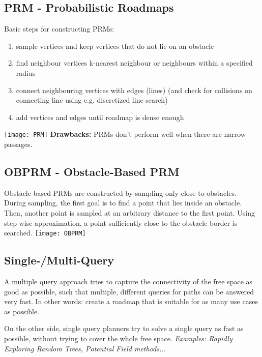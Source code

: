 \begin{multicols*}{2}
\subsection{PRM - Probabilistic Roadmaps}
Basic steps for constructing PRMs:
\begin{enumerate}
	\item sample vertices and keep vertices that do not lie on an obstacle
	\item find neighbour vertices
		\subitem k-nearest neighbour or
		\subitem neighbours within a specified radius
	\item connect neighbouring vertices with edges (lines) (and check for collisions on connecting line using e.g. discretized line search)
	\item add vertices and edges until roadmap is dense
enough
\end{enumerate}
\texttt{[image: PRM]}
\textbf{Drawbacks: } PRMs don't perform well when there are narrow passages.

\subsection{OBPRM - Obstacle-Based PRM}
Obstacle-based PRMs are constructed by sampling only close to obstacles. During sampling, the first goal is to find a point that lies inside an obstacle. Then, another point is sampled at an arbitrary distance to the first point. Using step-wise approximation, a point sufficiently close to the obstacle border is searched.
\texttt{[image: OBPRM]}

\subsection{Single-/Multi-Query}
A multiple query approach tries to capture the connectivity of the free space as good as possible, such that multiple, different queries for paths can be answered very fast. In other words: create a roadmap that is suitable for as many use cases as possible. 

On the other side, single query planners try to solve a single query as fast as possible, without trying to cover the whole free space. \textit{Examples: Rapidly Exploring Random Trees, Potential Field methods...}


\end{multicols*}

